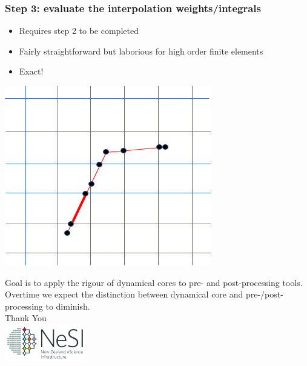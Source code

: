 \documentclass[aspectratio=169]{beamer}
\newcommand\BackgroundPicture[1]{%
\setbeamertemplate{background}{%
\parbox[c][\paperheight]{\paperwidth}{%
\vfill \hfill \texttt{[image: \#1]}
\hfill \vfill
}}}
\begin{document}
\begin{frame}[t]
  \frametitle{Step 3: evaluate the interpolation weights/integrals }
    \begin{block}{}
      \begin{itemize}%
	  \item Requires step 2 to be completed
      \item Fairly straightforward but laborious for high order finite elements
      \item Exact!
    \end{itemize}
  \end{block}
  \includegraphics[width=.3\linewidth]{interpStep4.png}
\end{frame}


\BackgroundPicture{NeSI/blank-02.png}
\begin{frame}[plain]
  \begin{center}
  Goal is to apply the rigour of dynamical cores to pre- and post-processing tools. Overtime we expect the distinction between dynamical core
  and pre-/post-processing to diminish.
  \\
  
    \vspace*{+2cm}
    {\Huge Thank You}\\
    \vspace*{+1cm}
    \includegraphics[width=100pt]{NeSI/nesi_logo.png}
  \end{center}
\end{frame}
\end{document}
